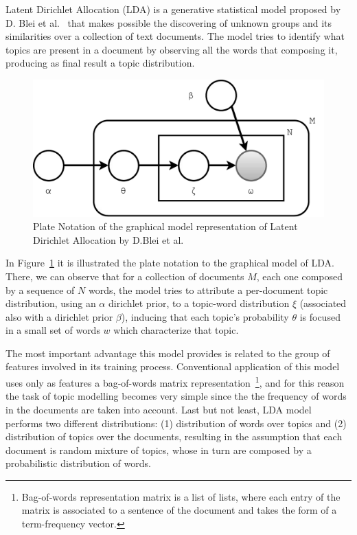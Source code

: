 Latent Dirichlet Allocation (LDA) is a generative statistical model proposed by D. Blei et al.~\cite{blei2003latent} that makes possible the discovering of unknown groups and its similarities over a collection of text documents. The model tries to identify what topics are present in a document by observing all the words that composing it, producing as final result a topic distribution. 

\begin{figure}[htbp]
	\centering
	\includegraphics[scale=0.41, keepaspectratio]{figures/lda-model.pdf}
	\caption[Plate notation of LDA by D.Blei et al. ~\cite{blei2003latent}]{Plate Notation of the graphical model representation of Latent Dirichlet Allocation by D.Blei et al. ~\cite{blei2003latent}}
	\label{fig:lda_graphical_model_representation}
\end{figure}

In Figure~\ref{fig:lda_graphical_model_representation} it is illustrated the plate notation to the graphical model of LDA. There, we can observe that for a collection of documents $M$, each one composed by a sequence of $N$ words, the model tries to attribute a per-document topic distribution, using an $\alpha$ dirichlet prior, to a topic-word distribution $\xi$ (associated also with a dirichlet prior $\beta$), inducing that each topic's probability $\theta$ is focused in a small set of words $w$ which characterize that topic.

The most important advantage this model provides is related to the group of features involved in its training process. Conventional application of this model uses only as features a bag-of-words matrix representation~\footnote{Bag-of-words representation matrix is a list of lists, where each entry of the matrix is associated to a sentence of the document and takes the form of a term-frequency vector.}, and for this reason the task of topic modelling becomes very simple since the the frequency of words in the documents are taken into account. Last but not least, LDA model performs two different distributions: (1) distribution of words over topics and (2) distribution of topics over the documents, resulting in the assumption that each document is random mixture of topics, whose in turn are composed by a probabilistic distribution of words.

